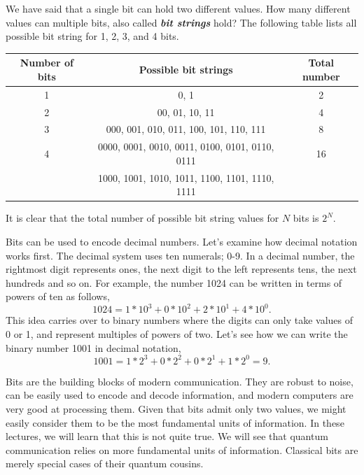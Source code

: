 We have said that a single bit can hold two different values.
How many different values can multiple bits, also called \textit{\textbf{bit strings}} hold?
The following table lists all possible bit string for 1, 2, 3, and 4 bits.
\begin{table}[h]
    \centering
    \begin{tabular}{c|c|c}
        Number of bits  & Possible bit strings & Total number \\
        \hline
        1 & 0, 1 & 2 \\
        2 & 00, 01, 10, 11 & 4 \\
        3 & 000, 001, 010, 011, 100, 101, 110, 111 & 8 \\
        4 & 0000, 0001, 0010, 0011, 0100, 0101, 0110, 0111 & 16 \\
        & 1000, 1001, 1010, 1011, 1100, 1101, 1110, 1111 & 
    \end{tabular}
\end{table}
It is clear that the total number of possible bit string values for $N$ bits is $2^N$.

Bits can be used to encode decimal numbers.
Let's examine how decimal notation works first.
The decimal system uses ten numerals; 0-9.
In a decimal number, the rightmost digit represents ones, the next digit to the left represents tens, the next hundreds and so on.
For example, the number 1024 can be written in terms of powers of ten as follows,
\begin{equation}
    1024 = 1 * 10^3 + 0 * 10^2 + 2 * 10^1 + 4 * 10^0.
\end{equation}
This idea carries over to binary numbers where the digits can only take values of 0 or 1, and represent multiples of powers of two.
Let's see how we can write the binary number 1001 in decimal notation,
\begin{equation}
    1001 = 1 * 2^3 + 0 * 2^2 + 0 * 2^1 + 1 * 2^0 = 9.
\end{equation}

Bits are the building blocks of modern communication.
They are robust to noise, can be easily used to encode and decode information, and modern computers are very good at processing them.
Given that bits admit only two values, we might easily consider them to be the most fundamental units of information.
In these lectures, we will learn that this is not quite true.
We will see that quantum communication relies on more fundamental units of information.
Classical bits are merely special cases of their quantum cousins.


